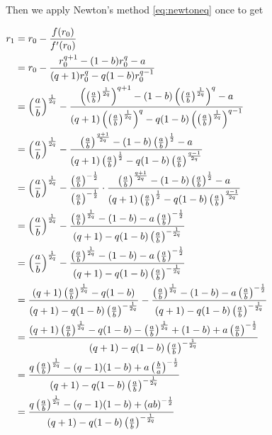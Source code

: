 \begin{result}
\begin{pf}
Then we apply Newton's method \ref{eq:newtoneq} once to get

$\begin{aligned}
r_1 
&= r_0 - \frac{f(r_0)}{f'(r_0)} \\
&= r_0 - \frac{r_0^{q+1} - (1-b)r_0^q - a}{(q+1)r_0^q - q(1-b)r_0^{q-1}} \\
&= \left(\frac{a}{b}\right)^{\frac1{2q}} - \frac{\left(\left(\frac{a}{b}\right)^{\frac1{2q}}\right)^{q+1} - (1-b)\left(\left(\frac{a}{b}\right)^{\frac1{2q}}\right)^q - a}{(q+1)\left(\left(\frac{a}{b}\right)^{\frac1{2q}}\right)^q - q(1-b)\left(\left(\frac{a}{b}\right)^{\frac1{2q}}\right)^{q-1}} \\
&= \left(\frac{a}{b}\right)^{\frac1{2q}} - \frac{\left(\frac{a}{b}\right)^{\frac{q+1}{2q}} - (1-b)\left(\frac{a}{b}\right)^{\frac12} - a}{(q+1)\left(\frac{a}{b}\right)^{\frac12} - q(1-b)\left(\frac{a}{b}\right)^{\frac{q-1}{2q}}}\\
&= \left(\frac{a}{b}\right)^{\frac1{2q}} - \frac{\left(\frac{a}{b}\right)^{-\frac12}}{\left(\frac{a}{b}\right)^{-\frac12}} \cdot
\frac{\left(\frac{a}{b}\right)^{\frac{q+1}{2q}} - (1-b)\left(\frac{a}{b}\right)^{\frac12} - a}{(q+1)\left(\frac{a}{b}\right)^{\frac12} - q(1-b)\left(\frac{a}{b}\right)^{\frac{q-1}{2q}}}\\
&= \left(\frac{a}{b}\right)^{\frac1{2q}} - \frac{\left(\frac{a}{b}\right)^{\frac1{2q}} - (1-b) - a\left(\frac{a}{b}\right)^{-\frac12}}{(q+1) - q(1-b)\left(\frac{a}{b}\right)^{-\frac{1}{2q}}}\\
&= \left(\frac{a}{b}\right)^{\frac1{2q}} - \frac{\left(\frac{a}{b}\right)^{\frac1{2q}} - (1-b) - a\left(\frac{a}{b}\right)^{-\frac12}}{(q+1) - q(1-b)\left(\frac{a}{b}\right)^{-\frac{1}{2q}}}\\
&= \frac{(q+1)\left(\frac{a}{b}\right)^{\frac{1}{2q}} - q(1-b)}{(q+1) - q(1-b)\left(\frac{a}{b}\right)^{-\frac{1}{2q}}} - \frac{\left(\frac{a}{b}\right)^{\frac1{2q}} - (1-b) - a\left(\frac{a}{b}\right)^{-\frac12}}{(q+1) - q(1-b)\left(\frac{a}{b}\right)^{-\frac{1}{2q}}}\\
&= \frac{(q+1)\left(\frac{a}{b}\right)^{\frac{1}{2q}} - q(1-b) - \left(\frac{a}{b}\right)^{\frac1{2q}} + (1-b) + a\left(\frac{a}{b}\right)^{-\frac12}}{(q+1) - q(1-b)\left(\frac{a}{b}\right)^{-\frac{1}{2q}}}\\
&= \frac{q\left(\frac{a}{b}\right)^{\frac{1}{2q}} - (q-1)(1-b) + a\left(\frac{b}{a}\right)^{-\frac12}}{(q+1) - q(1-b)\left(\frac{a}{b}\right)^{-\frac{1}{2q}}}\\
&= \frac{q\left(\frac{a}{b}\right)^{\frac{1}{2q}} - (q-1)(1-b) + \left(ab\right)^{-\frac12}}{(q+1) - q(1-b)\left(\frac{a}{b}\right)^{-\frac{1}{2q}}}\\
\end{aligned}$
\end{pf}
\end{result}

